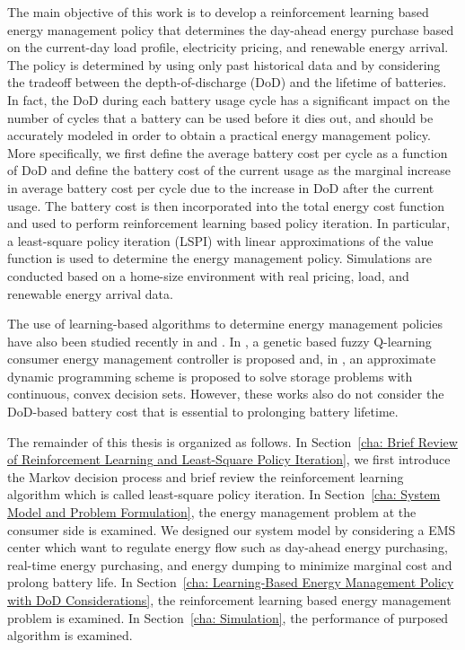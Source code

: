 The main objective of this work is to develop a reinforcement learning based energy management policy that determines the day-ahead energy purchase based on the current-day load profile, electricity pricing, and renewable energy arrival. The policy is determined by using only past historical data and by considering the tradeoff between the depth-of-discharge (DoD) and the lifetime of batteries. In fact, the DoD during each battery usage cycle has a significant impact on the number of cycles that a battery can be used before it dies out, and should be accurately modeled in order to obtain a practical energy management policy. More specifically, we first define the average battery cost per cycle as a function of DoD and define the battery cost of the current usage as the marginal increase in average battery cost per cycle due to the increase in DoD after the current usage. The battery cost is then incorporated into the total energy cost function and used to perform reinforcement learning based policy iteration. In particular, a least-square policy iteration (LSPI) with linear approximations of the value function is used to determine the energy management policy. Simulations are conducted based on a home-size environment with real pricing, load, and renewable energy arrival data.

The use of learning-based algorithms to determine energy management policies have also been studied recently in \cite{xin:2012} and \cite{hannah:2011}. In \cite{xin:2012}, a genetic based fuzzy Q-learning consumer energy management controller is proposed and, in \cite{hannah:2011}, an approximate dynamic programming scheme is proposed to solve storage problems with continuous, convex decision sets. However, these works also do not consider the DoD-based battery cost that is essential to prolonging battery lifetime.

The remainder of this thesis is organized as follows.
In Section~\ref{cha: Brief Review of Reinforcement Learning and Least-Square Policy Iteration}, we first introduce the Markov decision process and brief review the reinforcement learning algorithm which is called least-square policy iteration.
In Section~\ref{cha: System Model and Problem Formulation}, the energy management problem at the consumer side is examined. We designed our system model by considering a EMS center which want to regulate energy flow such as day-ahead energy purchasing, real-time energy purchasing, and energy dumping to minimize marginal cost and prolong battery life.
In Section~\ref{cha: Learning-Based Energy Management Policy with DoD Considerations}, the reinforcement learning based energy management problem is examined.
In Section~\ref{cha: Simulation}, the performance of purposed algorithm is examined.
